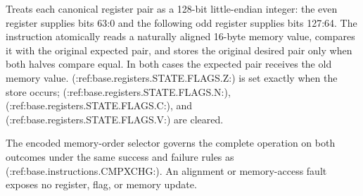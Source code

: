 Treats each canonical register pair as a 128-bit little-endian integer: the even register supplies bits 63:0 and
the following odd register supplies bits 127:64. The instruction atomically reads a naturally aligned 16-byte
memory value, compares it with the original expected pair, and stores the original desired pair only when both
halves compare equal. In both cases the expected pair receives the old memory value. (:ref:base.registers.STATE.FLAGS.Z:) is set exactly when the
store occurs; (:ref:base.registers.STATE.FLAGS.N:), (:ref:base.registers.STATE.FLAGS.C:), and (:ref:base.registers.STATE.FLAGS.V:) are cleared.

The encoded memory-order selector governs the complete operation on both outcomes under the same success and
failure rules as (:ref:base.instructions.CMPXCHG:). An alignment or memory-access fault exposes no register, flag,
or memory update.
